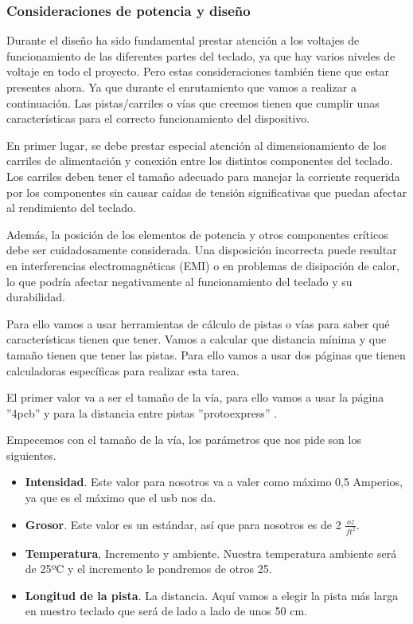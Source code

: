 \subsubsection{Consideraciones de potencia y diseño}
Durante el diseño ha sido fundamental prestar atención a los voltajes de funcionamiento de las diferentes partes del teclado, ya que hay varios niveles de voltaje en todo el proyecto. Pero estas consideraciones también tiene que estar presentes ahora. Ya que durante el enrutamiento que vamos a realizar a continuación. Las pistas/carriles o vías que creemos tienen que cumplir unas características para el correcto funcionamiento del dispositivo.

En primer lugar, se debe prestar especial atención al dimensionamiento de los carriles de alimentación y conexión entre los distintos componentes del teclado. Los carriles deben tener el tamaño adecuado para manejar la corriente requerida por los componentes sin causar caídas de tensión significativas que puedan afectar al rendimiento del teclado.

Además, la posición de los elementos de potencia y otros componentes críticos debe ser cuidadosamente considerada. Una disposición incorrecta puede resultar en interferencias electromagnéticas (EMI) o en problemas de disipación de calor, lo que podría afectar negativamente al funcionamiento del teclado y su durabilidad.

Para ello vamos a usar herramientas de cálculo de pistas o vías para saber qué características tienen que tener. Vamos a calcular que distancia mínima y que tamaño tienen que tener las pistas. Para ello vamos a usar dos páginas que tienen calculadoras específicas para realizar esta tarea.

El primer valor va a ser el tamaño de la vía, para ello vamos a usar la página ''4pcb'' \cite{4pcbCalculator} y para la distancia entre pistas ''protoexpress'' \cite{protoexpressCalculator}. 

Empecemos con el tamaño de la vía, los parámetros que nos pide son los siguientes.
\begin{itemize}
    \item \textbf{Intensidad}. Este valor para nosotros va a valer como máximo 0,5 Amperios, ya que es el máximo que el usb nos da.
    \item \textbf{Grosor}. Este valor es un estándar, así que para nosotros es de 2 $\frac{oz}{ft^2}$.
    \item \textbf{Temperatura}, Incremento y ambiente. Nuestra temperatura ambiente será de 25ºC y el incremento le pondremos de otros 25.
    \item \textbf{Longitud de la pista}. La distancia. Aquí vamos a elegir la pista más larga en nuestro teclado que será de lado a lado de unos 50 cm.
\end{itemize}

